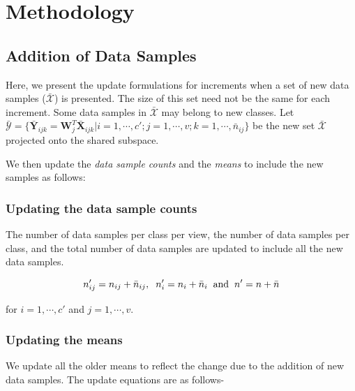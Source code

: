 \section{Methodology}
\label{sec:2DMvIDDA_Algo}
\subsection{Addition of Data Samples}
\label{subs:2DMvIDDA_Inc}
Here, we present the update formulations for increments when a set of new data samples ($\bar{\mathcal{X}}$) is presented. The size of this set need not be the same for each increment. Some data samples in $\bar{\mathcal{X}}$ may belong to new classes. Let $\bar{\mathcal{Y}} = \{ \bar{\textbf{Y}}_{ijk} = \textbf{W}_j^T \bar{\textbf{X}}_{ijk} | i=1,\cdots,c'; j=1,\cdots,v; k=1,\cdots,\bar{n}_{ij} \}$ be the new set $\bar{\mathcal{X}}$ projected onto the shared subspace.

We then update the \textit{data sample counts} and the \textit{means} to include the new samples as follows:



\subsubsection{Updating the data sample counts}
\label{ssubs:2DMvIDDA_Inc_n}
The number of data samples per class per view, the number of data samples per class, and the total number of data samples are updated to include all the new data samples.

\begin{equation}
\label{eqn:nI}
n'_{ij} = n_{ij} + \bar{n}_{ij}, \hspace{0.2cm} n'_i = n_i + \bar{n}_i \hspace{0.2cm} \text{and} \hspace{0.2cm} n' = n + \bar{n}
\end{equation}

for $i = 1, \cdots, c'$ and $j = 1, \cdots, v$.



\subsubsection{Updating the means}
\label{ssubs:2DMvIDDA_Inc_M}
We update all the older means to reflect the change due to the addition of new data samples. The update equations are as follows-

